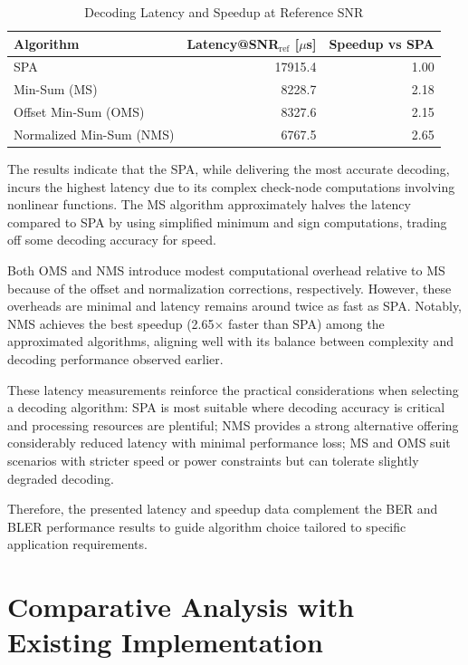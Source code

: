\documentclass[../main.tex]{subfiles}
\begin{document}
\begin{table}[htbp]
\centering
\caption{Decoding Latency and Speedup at Reference SNR}
\label{tab:decoding_speed}
\begin{tabular}{l r r}
\toprule
Algorithm & Latency@SNR$_\text{ref}$ [$\mu$s] & Speedup vs SPA \\
\midrule
SPA & 17915.4 & 1.00 \\
Min-Sum (MS)  & 8228.7 & 2.18 \\
Offset Min-Sum (OMS) & 8327.6 & 2.15 \\
Normalized Min-Sum (NMS) & 6767.5 & 2.65 \\
\bottomrule
\end{tabular}
\end{table}

The results indicate that the SPA, while delivering the most accurate decoding, incurs the highest latency due to its complex check-node computations involving nonlinear functions. The MS algorithm approximately halves the latency compared to SPA by using simplified minimum and sign computations, trading off some decoding accuracy for speed.

Both OMS and NMS introduce modest computational overhead relative to MS because of the offset and normalization corrections, respectively. However, these overheads are minimal and latency remains around twice as fast as SPA. Notably, NMS achieves the best speedup (2.65× faster than SPA) among the approximated algorithms, aligning well with its balance between complexity and decoding performance observed earlier.

These latency measurements reinforce the practical considerations when selecting a decoding algorithm: SPA is most suitable where decoding accuracy is critical and processing resources are plentiful; NMS provides a strong alternative offering considerably reduced latency with minimal performance loss; MS and OMS suit scenarios with stricter speed or power constraints but can tolerate slightly degraded decoding.

Therefore, the presented latency and speedup data complement the BER and BLER performance results to guide algorithm choice tailored to specific application requirements.


\section{Comparative Analysis with Existing Implementation}
\label{sec:comparative_analysis}
\end{document}
